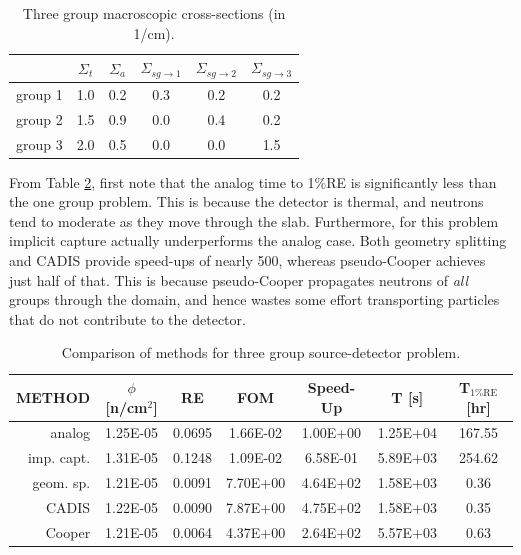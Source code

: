 \documentclass[letter,11pt]{article}
\begin{document}
\begin{table}[th]
 \caption{Three group macroscopic cross-sections (in 1/cm).}
 \begin{center} 
 {\small
 \begin{tabular*}{0.60\textwidth}{@{\extracolsep{\fill}} cccccc} 
  \toprule 
    & $\Sigma_t$ & $\Sigma_a$ & $\Sigma_{sg\to1}$ & $\Sigma_{sg\to2}$ & $\Sigma_{sg\to3}$  \\
  \midrule 
   group 1 & 1.0 & 0.2 & 0.3 & 0.2 & 0.2 \\ 
   group 2 & 1.5 & 0.9 & 0.0 & 0.4 & 0.2 \\ 
   group 3 & 2.0 & 0.5 & 0.0 & 0.0 & 1.5 \\ 
  \bottomrule 
 \end{tabular*}
 } 
 \end{center} 
 \label{tbl:3groupdata}  
\end{table}

From Table \ref{tbl:3gsd}, first note that the analog time to 1\%RE is significantly less than the one group problem.  This is because the detector is thermal, and neutrons tend to moderate as they move through the slab.  Furthermore, for this problem implicit capture actually underperforms the analog case.  Both geometry splitting and CADIS provide speed-ups of nearly 500, whereas pseudo-Cooper achieves just half of that.  This is because pseudo-Cooper propagates neutrons of {\it all} groups through the domain, and hence wastes some effort transporting particles that do not contribute to the detector.

\begin{table}[th]
 \caption{Comparison of methods for three group source-detector problem.}
 \begin{center} 
{\small
 \begin{tabular*}{0.90\textwidth}{@{\extracolsep{\fill}} rcccccc } 
  \toprule 
   {\sc METHOD}  &  $\phi$ [n/cm$^2$]  &  {\sc RE} & {\sc FOM} &  {\sc Speed-Up} & {\sc T [s]} & {\sc T$_{\mathrm{1\% RE}}$ [hr]} \\
  \midrule 
   analog      & 1.25E-05 & 0.0695 & 1.66E-02 & 1.00E+00 & 1.25E+04 & 167.55 \\
   imp. capt.  & 1.31E-05 & 0.1248 & 1.09E-02 & 6.58E-01 & 5.89E+03 & 254.62 \\
   geom. sp.   & 1.21E-05 & 0.0091 & 7.70E+00 & 4.64E+02 & 1.58E+03 &  0.36 \\
   CADIS       & 1.22E-05 & 0.0090 & 7.87E+00 & 4.75E+02 & 1.58E+03 & 0.35 \\ 
   Cooper      & 1.21E-05 & 0.0064 & 4.37E+00 & 2.64E+02 & 5.57E+03 & 0.63 \\
  \bottomrule 
 \end{tabular*} 
}
 \end{center} 
 \label{tbl:3gsd}  
\end{table}
\end{document}
